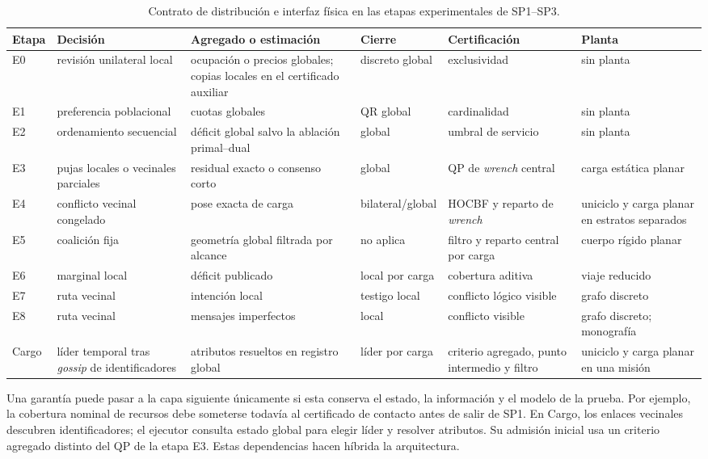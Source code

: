 \begin{table}[!htbp]
 \centering
 \caption{Contrato de distribución e interfaz física en las etapas experimentales de SP1--SP3.}
 \label{tab:results-model-map}
 \scriptsize
 \setlength{\tabcolsep}{2.2pt}
 \renewcommand{\arraystretch}{1.08}
 \begin{tabularx}{\textwidth}{@{}p{0.70cm}p{2.35cm}p{2.70cm}p{2.20cm}p{2.45cm}X@{}}
  \toprule
  Etapa & Decisión & Agregado o estimación & Cierre & Certificación & Planta \\
  \midrule
  E0 & revisión unilateral local & ocupación o precios globales; copias locales en el certificado auxiliar & discreto global & exclusividad & sin planta \\
  E1 & preferencia poblacional & cuotas globales & QR global & cardinalidad & sin planta \\
  E2 & ordenamiento secuencial & déficit global salvo la ablación primal--dual & global & umbral de servicio & sin planta \\
  E3 & pujas locales o vecinales parciales & residual exacto o consenso corto & global & QP de \emph{wrench} central & carga estática planar \\
  E4 & conflicto vecinal congelado & pose exacta de carga & bilateral/global & HOCBF y reparto de \emph{wrench} & uniciclo y carga planar en estratos separados \\
  E5 & coalición fija & geometría global filtrada por alcance & no aplica & filtro y reparto central por carga & cuerpo rígido planar \\
  E6 & marginal local & déficit publicado & local por carga & cobertura aditiva & viaje reducido \\
  E7 & ruta vecinal & intención local & testigo local & conflicto lógico visible & grafo discreto \\
  E8 & ruta vecinal & mensajes imperfectos & local & conflicto visible & grafo discreto; monografía \\
  Cargo & líder temporal tras \emph{gossip} de identificadores & atributos resueltos en registro global & líder por carga & criterio agregado, punto intermedio y filtro & uniciclo y carga planar en una misión \\
  \bottomrule
 \end{tabularx}
 \viuownsource
\end{table}

Una garantía puede pasar a la capa siguiente únicamente si esta conserva el estado, la información y el modelo de la prueba. Por ejemplo, la cobertura nominal de recursos debe someterse todavía al certificado de contacto antes de salir de SP1. En Cargo, los enlaces vecinales descubren identificadores; el ejecutor consulta estado global para elegir líder y resolver atributos. Su admisión inicial usa un criterio agregado distinto del QP de la etapa E3. Estas dependencias hacen híbrida la arquitectura.


